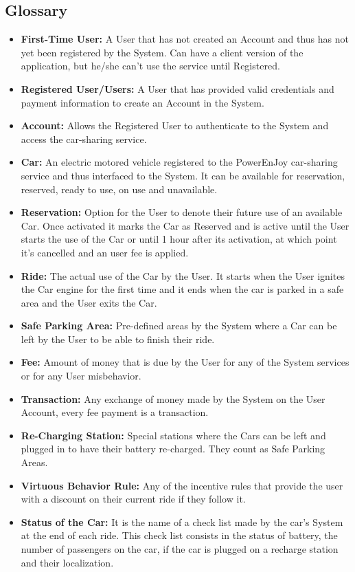 \documentclass[a4paper]{article}
\begin{document}
\subsection{Glossary}
\begin{itemize}
\item \textbf{First-Time User:} A User that has not created an Account and thus has not yet been registered by the System. Can have a client version of the application, but he/she can't use the service until Registered.
\item \textbf{Registered User/Users:} A User that has provided valid credentials and payment information to create an Account in the System.
\item \textbf{Account:} Allows the Registered User to authenticate to the System and access the car-sharing service.
\item \textbf{Car:} An electric motored vehicle registered to the PowerEnJoy car-sharing service and thus interfaced to the System. It can be available for reservation, reserved, ready to use, on use and unavailable.
\item \textbf{Reservation:} Option for the User to denote their future use of an available Car. Once activated it marks the Car as Reserved and is active until the User starts the use of the Car or until 1 hour after its activation, at which point it's cancelled and an user fee is applied.
\item \textbf{Ride:} The actual use of the Car by the User. It starts when the User ignites the Car engine for the first time and it ends when the car is parked in a safe area and the User exits the Car.
\item \textbf{Safe Parking Area:} Pre-defined areas by the System where a Car can be left by the User to be able to finish their ride.
\item \textbf{Fee:} Amount of money that is due by the User for any of the System services or for any User misbehavior.
\item \textbf{Transaction:} Any exchange of money made by the System on the User Account, every fee payment is a transaction.
\item \textbf{Re-Charging Station:} Special stations where the Cars can be left and plugged in to have their battery re-charged. They count as Safe Parking Areas.
\item \textbf{Virtuous Behavior Rule:} Any of the incentive rules that provide the user with a discount on their current ride if they follow it.
\item \textbf{Status of the Car:} It is the name of a check list made by the car’s System at the end of each ride. This check list consists in the status of battery, the number of passengers on the car, if the car is plugged on a recharge station and their localization.

\end{itemize}
\end{document}
